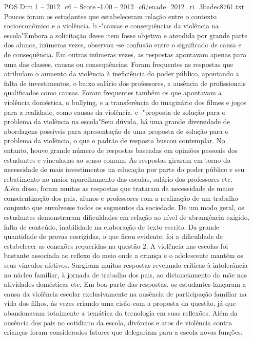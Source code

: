 \begin{textsample}{POS Dim 1 – 2012\_c6 – Score -1.00 – 2012\_c6/enade\_2012\_ri\_3badec8761.txt}
Poucos foram os estudantes que estabeleceram relação entre o contexto socioeconômico e a violência. b -"causas e consequências da violência na escola"Embora a solicitação desse item fosse objetiva e atendida por grande parte dos alunos, inúmeras vezes, observou -se confusão entre o significado de causa e de consequência.
Em outras inúmeras vezes, as respostas apontavam apenas para uma das classes, causas ou consequências.
Foram frequentes as respostas que atribuíam o aumento da violência à ineficiência do poder público, apontando a falta de investimentos, o baixo salário dos professores, a ausência de profissionais qualificados como causas.
Foram frequentes também os que apontavam a violência doméstica, o bullying, e a transferência do imaginário dos filmes e jogos para a realidade, como causas da violência. c -"proposta de solução para o problema da violência na escola"Sem dúvida, há uma grande diversidade de abordagens possíveis para apresentação de uma proposta de solução para o problema da violência, o que o padrão de resposta buscou contemplar.
No entanto, houve grande número de respostas baseadas em opiniões pessoais dos estudantes e vinculadas ao senso comum.
As respostas giraram em torno da necessidade de mais investimentos na educação por parte do poder público e seu rebatimento no maior aparelhamento das escolas, salário dos professores etc.
Além disso, foram muitas as respostas que trataram da necessidade de maior conscientização dos pais, alunos e professores com a realização de um trabalho conjunto que envolvesse todos os segmentos da sociedade.
De um modo geral, os estudantes demonstraram dificuldades em relação ao nível de abrangência exigido, falta de conteúdo, inabilidade na elaboração de texto escrito.
Da grande quantidade de provas corrigidas, o que ficou evidente, foi a dificuldade de estabelecer as conexões requeridas na questão 2.
A violência nas escolas foi bastante associada ao reflexo do meio onde a criança e o adolescente mantém os seus vínculos afetivos.
Surgiram muitas respostas revelando críticas à intolerância no núcleo familiar, à jornada de trabalho dos pais, ao distanciamento da mãe nas atividades domésticas etc.
Em boa parte das respostas, os estudantes lançaram a causa da violência escolar exclusivamente na ausência de participação familiar na vida dos filhos, às vezes criando uma cisão com a proposta da questão, já que abandonavam totalmente a temática da tecnologia em suas reflexões.
Além da ausência dos pais no cotidiano da escola, divórcios e atos de violência contra crianças foram considerados fatores que delegariam para a escola novas funções.

\end{textsample}
